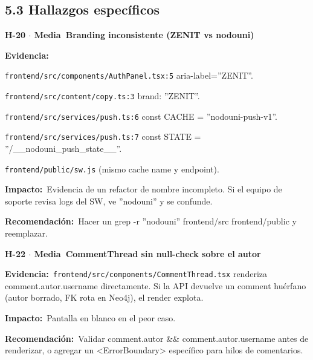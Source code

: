 \documentclass[10pt,a4paper]{article}
\newcommand{\code}[1]{\nolinkurl{#1}}
\newcommand{\badgeMedia}{\colorbox{yellow!35}{\textcolor{brown!90!black}{\textbf{\footnotesize Media}}}}
\begin{document}
\subsection{5.3 Hallazgos específicos}
\vspace{0.8em}\noindent\textbf{\large H-20 $\cdot$ \badgeMedia\  Branding inconsistente (ZENIT vs nodouni)}\par\vspace{0.3em}
\noindent\textbf{Evidencia:}\ \par\vspace{0.4em}
\code{frontend/src/components/AuthPanel.tsx:5} aria-label=''ZENIT''.\par\vspace{0.4em}
\code{frontend/src/content/copy.ts:3} brand: ''ZENIT''.\par\vspace{0.4em}
\code{frontend/src/services/push.ts:6} const CACHE = ''nodouni-push-v1''.\par\vspace{0.4em}
\code{frontend/src/services/push.ts:7} const STATE = ''/\_\_nodouni\_push\_state\_\_''.\par\vspace{0.4em}
\code{frontend/public/sw.js} (mismo cache name y endpoint).\par\vspace{0.4em}
\noindent\textbf{Impacto:}\ Evidencia de un refactor de nombre incompleto. Si el equipo de soporte revisa logs del SW, ve ''nodouni'' y se confunde.\par\vspace{0.4em}
\noindent\textbf{Recomendación:}\ Hacer un grep -r ''nodouni'' frontend/src frontend/public y reemplazar.\par\vspace{0.4em}
\vspace{0.8em}\noindent\textbf{\large H-22 $\cdot$ \badgeMedia\  CommentThread sin null-check sobre el autor}\par\vspace{0.3em}
\noindent\textbf{Evidencia:}\ \code{frontend/src/components/CommentThread.tsx} renderiza comment.autor.username directamente. Si la API devuelve un comment huérfano (autor borrado, FK rota en Neo4j), el render explota.\par\vspace{0.4em}
\noindent\textbf{Impacto:}\ Pantalla en blanco en el peor caso.\par\vspace{0.4em}
\noindent\textbf{Recomendación:}\ Validar comment.autor \&\& comment.autor.username antes de renderizar, o agregar un <ErrorBoundary> específico para hilos de comentarios.\par\vspace{0.4em}
\end{document}
